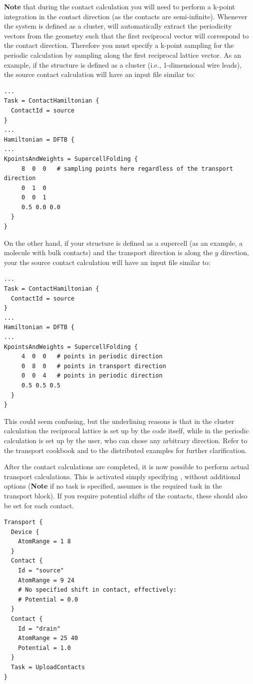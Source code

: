 {\bf Note} that during the contact calculation you will need to perform a
k-point integration in the contact direction (as the contacts are
semi-infinite).  Whenever the system is defined as a cluster, \dftbp{} will
automatically extract the periodicity vectors from the geometry such that the
first reciprocal vector will correspond to the contact direction.  Therefore you
must specify a k-point sampling for the periodic calculation by sampling along
the first reciprocal lattice vector.  As an example, if the structure is defined
as a cluster (i.e., 1-dimensional wire leads), the source contact calculation
will have an input file similar to:

\begin{verbatim}
...
Task = ContactHamiltonian {
  ContactId = source
}
...
Hamiltonian = DFTB {
...
KpointsAndWeights = SupercellFolding {
     8  0  0   # sampling points here regardless of the transport direction
     0  1  0
     0  0  1
     0.5 0.0 0.0
  }
}
\end{verbatim}

On the other hand, if your structure is defined as a supercell (as an example, a
molecule with bulk contacts) and the transport direction is along the $y$
direction, your the source contact calculation will have an input file similar
to:

\begin{verbatim}
...
Task = ContactHamiltonian {
  ContactId = source
}
...
Hamiltonian = DFTB {
...
KpointsAndWeights = SupercellFolding {
     4  0  0   # points in periodic direction
     0  8  0   # points in transport direction
     0  0  4   # points in periodic direction
     0.5 0.5 0.5
  }
}
\end{verbatim}


This could seem confusing, but the underlining reasons is that in the cluster
calculation the reciprocal lattice is set up by the code itself, while in the
periodic calculation is set up by the user, who can chose any arbitrary
direction.  Refer to the transport cookbook and to the distributed examples for
further clarification.

 After the
contact calculations are completed, it is now possible to perform
actual transport calculations. This is activated simply specifying
, without additional options ({\bf Note} if
no task is specified, \dftbp{} assumes  is the
required task in the transport block). If you require potential shifts
of the contacts, these should also be set for each contact.
\begin{verbatim}
Transport {
  Device {
    AtomRange = 1 8
  }
  Contact {
    Id = "source"
    AtomRange = 9 24
    # No specified shift in contact, effectively:
    # Potential = 0.0
  }
  Contact {
    Id = "drain"
    AtomRange = 25 40
    Potential = 1.0
  }
  Task = UploadContacts
}
\end{verbatim}


